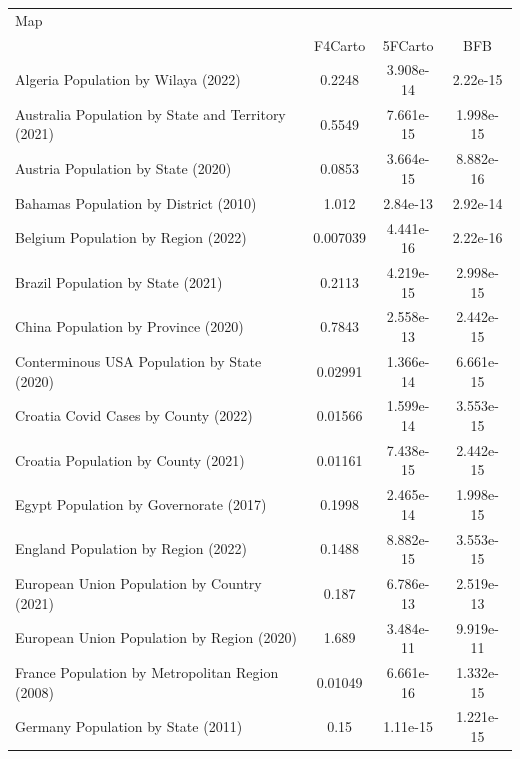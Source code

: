 \begin{tabular}{lccc}
\toprule
Map &  \\
\cmidrule(lr){2-4}
     & F4Carto & 5FCarto & BFB \\
\midrule

                      Algeria Population by Wilaya (2022) &   0.2248 & 3.908e-14 &    2.22e-15 \\
       Australia Population by State and Territory (2021) &   0.5549 & 7.661e-15 &   1.998e-15 \\
                       Austria Population by State (2020) &   0.0853 & 3.664e-15 &   8.882e-16 \\
                    Bahamas Population by District (2010) &    1.012 &  2.84e-13 &    2.92e-14 \\
                      Belgium Population by Region (2022) & 0.007039 & 4.441e-16 &    2.22e-16 \\
                        Brazil Population by State (2021) &   0.2113 & 4.219e-15 &   2.998e-15 \\
                      China Population by Province (2020) &   0.7843 & 2.558e-13 &   2.442e-15 \\
              Conterminous USA Population by State (2020) &  0.02991 & 1.366e-14 &   6.661e-15 \\
                     Croatia Covid Cases by County (2022) &  0.01566 & 1.599e-14 &   3.553e-15 \\
                      Croatia Population by County (2021) &  0.01161 & 7.438e-15 &   2.442e-15 \\
                   Egypt Population by Governorate (2017) &   0.1998 & 2.465e-14 &   1.998e-15 \\
                      England Population by Region (2022) &   0.1488 & 8.882e-15 &   3.553e-15 \\
              European Union Population by Country (2021) &    0.187 & 6.786e-13 &   2.519e-13 \\
               European Union Population by Region (2020) &    1.689 & 3.484e-11 &   9.919e-11 \\
          France Population by Metropolitan Region (2008) &  0.01049 & 6.661e-16 &   1.332e-15 \\
                       Germany Population by State (2011) &     0.15 &  1.11e-15 &   1.221e-15 \\

\end{tabular}
